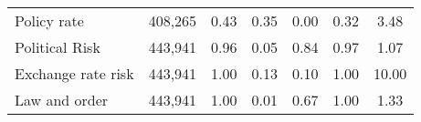 \begin{table}[htbp]
\begin{tabular}{l*{1}{cccccc}}
Policy rate         &      408,265&        0.43&        0.35&        0.00&        0.32&        3.48\\
Political Risk      &      443,941&        0.96&        0.05&        0.84&        0.97&        1.07\\
Exchange rate risk  &      443,941&        1.00&        0.13&        0.10&        1.00&       10.00\\
Law and order       &      443,941&        1.00&        0.01&        0.67&        1.00&        1.33\\
\hline\hline
\end{tabular}
\end{table}
